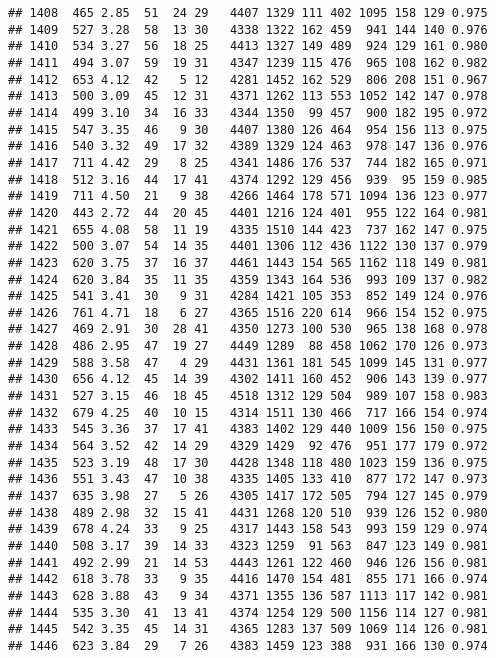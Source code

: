 \documentclass[]{article}
\begin{document}
\begin{verbatim}
## 1408  465 2.85  51  24 29   4407 1329 111 402 1095 158 129 0.975
## 1409  527 3.28  58  13 30   4338 1322 162 459  941 144 140 0.976
## 1410  534 3.27  56  18 25   4413 1327 149 489  924 129 161 0.980
## 1411  494 3.07  59  19 31   4347 1239 115 476  965 108 162 0.982
## 1412  653 4.12  42   5 12   4281 1452 162 529  806 208 151 0.967
## 1413  500 3.09  45  12 31   4371 1262 113 553 1052 142 147 0.978
## 1414  499 3.10  34  16 33   4344 1350  99 457  900 182 195 0.972
## 1415  547 3.35  46   9 30   4407 1380 126 464  954 156 113 0.975
## 1416  540 3.32  49  17 32   4389 1329 124 463  978 147 136 0.976
## 1417  711 4.42  29   8 25   4341 1486 176 537  744 182 165 0.971
## 1418  512 3.16  44  17 41   4374 1292 129 456  939  95 159 0.985
## 1419  711 4.50  21   9 38   4266 1464 178 571 1094 136 123 0.977
## 1420  443 2.72  44  20 45   4401 1216 124 401  955 122 164 0.981
## 1421  655 4.08  58  11 19   4335 1510 144 423  737 162 147 0.975
## 1422  500 3.07  54  14 35   4401 1306 112 436 1122 130 137 0.979
## 1423  620 3.75  37  16 37   4461 1443 154 565 1162 118 149 0.981
## 1424  620 3.84  35  11 35   4359 1343 164 536  993 109 137 0.982
## 1425  541 3.41  30   9 31   4284 1421 105 353  852 149 124 0.976
## 1426  761 4.71  18   6 27   4365 1516 220 614  966 154 152 0.975
## 1427  469 2.91  30  28 41   4350 1273 100 530  965 138 168 0.978
## 1428  486 2.95  47  19 27   4449 1289  88 458 1062 170 126 0.973
## 1429  588 3.58  47   4 29   4431 1361 181 545 1099 145 131 0.977
## 1430  656 4.12  45  14 39   4302 1411 160 452  906 143 139 0.977
## 1431  527 3.15  46  18 45   4518 1312 129 504  989 107 158 0.983
## 1432  679 4.25  40  10 15   4314 1511 130 466  717 166 154 0.974
## 1433  545 3.36  37  17 41   4383 1402 129 440 1009 156 150 0.975
## 1434  564 3.52  42  14 29   4329 1429  92 476  951 177 179 0.972
## 1435  523 3.19  48  17 30   4428 1348 118 480 1023 159 136 0.975
## 1436  551 3.43  47  10 38   4335 1405 133 410  877 172 147 0.973
## 1437  635 3.98  27   5 26   4305 1417 172 505  794 127 145 0.979
## 1438  489 2.98  32  15 41   4431 1268 120 510  939 126 152 0.980
## 1439  678 4.24  33   9 25   4317 1443 158 543  993 159 129 0.974
## 1440  508 3.17  39  14 33   4323 1259  91 563  847 123 149 0.981
## 1441  492 2.99  21  14 53   4443 1261 122 460  946 126 156 0.981
## 1442  618 3.78  33   9 35   4416 1470 154 481  855 171 166 0.974
## 1443  628 3.88  43   9 34   4371 1355 136 587 1113 117 142 0.981
## 1444  535 3.30  41  13 41   4374 1254 129 500 1156 114 127 0.981
## 1445  542 3.35  45  14 31   4365 1283 137 509 1069 114 126 0.981
## 1446  623 3.84  29   7 26   4383 1459 123 388  931 166 130 0.974

\end{verbatim}
\end{document}
